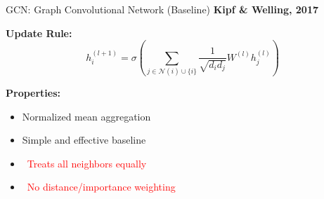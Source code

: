 \documentclass[aspectratio=169]{beamer}
\begin{document}
\begin{frame}{GCN: Graph Convolutional Network (Baseline)}
    \textbf{Kipf \& Welling, 2017}
    
    \vspace{0.5em}
    \textbf{Update Rule:}
    \begin{equation*}
        h_i^{(l+1)} = \sigma\left(\sum_{j \in \mathcal{N}(i) \cup \{i\}} \frac{1}{\sqrt{d_i d_j}} W^{(l)} h_j^{(l)}\right)
    \end{equation*}
    
    \vspace{0.5em}
    \textbf{Properties:}
    \begin{itemize}
        \item Normalized mean aggregation
        \item Simple and effective baseline
        \item \textcolor{red}{\faTimes\ Treats all neighbors equally}
        \item \textcolor{red}{\faTimes\ No distance/importance weighting}
    \end{itemize}
\end{frame}
\end{document}
